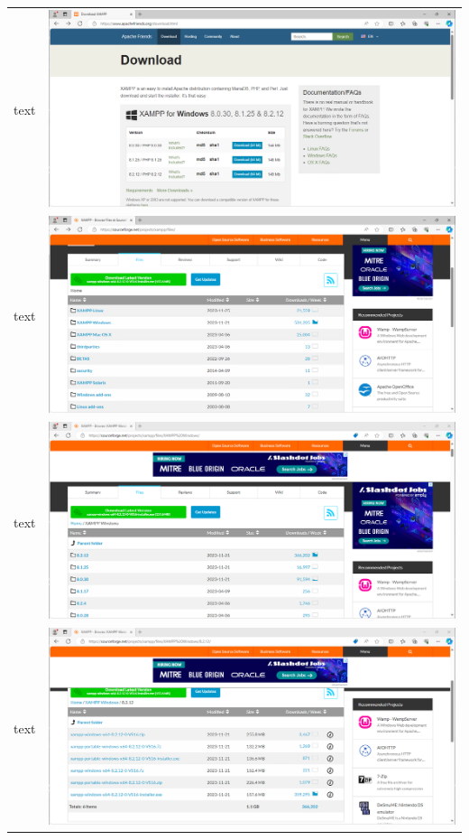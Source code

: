 \documentclass[11pt,a4paper]{report}
\begin{document}
        \begin{tabular}{ l r }
            text & \includegraphics[scale=1.0]{xampp01} \\ %
            text & \includegraphics[scale=1.0]{xampp02} \\
            text & \includegraphics[scale=1.0]{xampp03} \\
            text & \includegraphics[scale=1.0]{xampp04} \\

\end{tabular}
\end{document}

